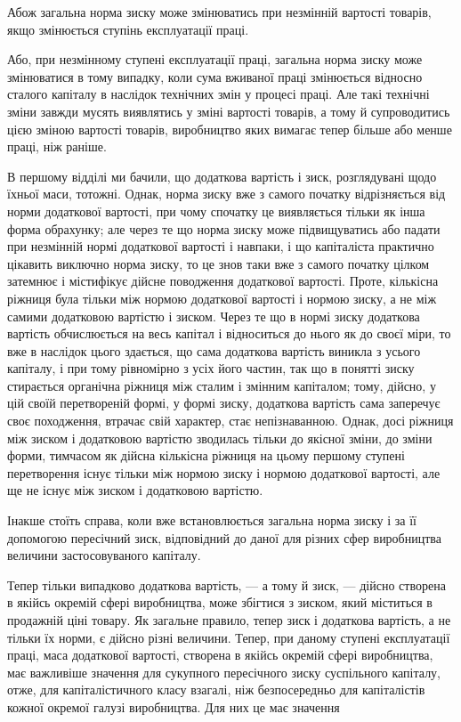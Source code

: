 
Абож загальна норма зиску може змінюватись при незмінній вартості товарів, якщо змінюється ступінь
експлуатації праці.

Або, при незмінному ступені експлуатації праці, загальна
норма зиску може змінюватися в тому випадку, коли сума вживаної праці змінюється відносно сталого
капіталу в наслідок
технічних змін у процесі праці. Але такі технічні зміни завжди
мусять виявлятись у зміні вартості товарів, а тому й супроводитись цією зміною вартості товарів,
виробництво яких вимагає
тепер більше або менше праці, ніж раніше.

В першому відділі ми бачили, що додаткова вартість і зиск,
розглядувані щодо їхньої маси, тотожні. Однак, норма зиску вже
з самого початку відрізняється від норми додаткової вартості,
при чому спочатку це виявляється тільки як інша форма обрахунку; але через те що норма зиску може
підвищуватись або
падати при незмінній нормі додаткової вартості і навпаки, і що
капіталіста практично цікавить виключно норма зиску, то це
знов таки вже з самого початку цілком затемнює і містифікує
дійсне поводження додаткової вартості. Проте, кількісна ріжниця
була тільки між нормою додаткової вартості і нормою зиску,
а не між самими додатковою вартістю і зиском. Через те що
в нормі зиску додаткова вартість обчислюється на весь капітал
і відноситься до нього як до своєї міри, то вже в наслідок
цього здається, що сама додаткова вартість виникла з усього
капіталу, і при тому рівномірно з усіх його частин, так що
в понятті зиску стирається органічна ріжниця між сталим і змінним капіталом; тому, дійсно, у цій
своїй перетвореній формі,
у формі зиску, додаткова вартість сама заперечує своє походження, втрачає свій характер, стає
непізнаванною. Однак, досі
ріжниця між зиском і додатковою вартістю зводилась тільки до
якісної зміни, до зміни форми, тимчасом як дійсна кількісна
ріжниця на цьому першому ступені перетворення існує тільки
між нормою зиску і нормою додаткової вартості, але ще не існує
між зиском і додатковою вартістю.

Інакше стоїть справа, коли вже встановлюється загальна
норма зиску і за її допомогою пересічний зиск, відповідний до
даної для різних сфер виробництва величини застосовуваного
капіталу.

Тепер тільки випадково додаткова вартість, — а тому й зиск, — дійсно створена в якійсь окремій сфері
виробництва, може збігтися з зиском, який міститься в продажній ціні товару. Як загальне правило,
тепер зиск і додаткова вартість, а не тільки їх
норми, є дійсно різні величини. Тепер, при даному ступені
експлуатації праці, маса додаткової вартості, створена в якійсь
окремій сфері виробництва, має важливіше значення для сукупного пересічного зиску суспільного
капіталу, отже, для капіталістичного класу взагалі, ніж безпосередньо для капіталістів кожної
окремої галузі виробництва. Для них це має значення
\parbreak{}  %
